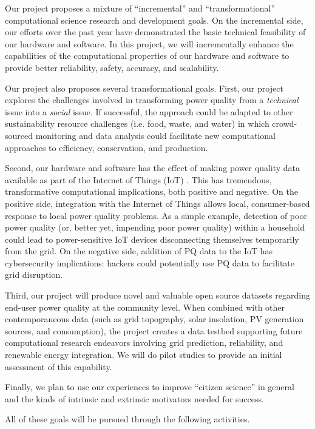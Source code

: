 Our project proposes a mixture of ``incremental'' and ``transformational'' computational science research and development goals. On the incremental side, our efforts over the past year have demonstrated the basic technical feasibility of our hardware and software. In this project, we will incrementally enhance the capabilities of the computational properties of our hardware and software to provide better reliability, safety, accuracy, and scalability.   

Our project also proposes several transformational goals.  First, our project explores the challenges involved in transforming power quality from a {\em technical} issue into a {\em social} issue. If successful, the approach could be adapted to other sustainability resource challenges (i.e. food, waste, and water) in which crowd-sourced monitoring and data analysis could facilitate new computational approaches to efficiency, conservation, and production.

Second, our hardware and software has the effect of making power quality data available as part of the Internet of Things (IoT) \cite{iot}. This has tremendous, transformative computational implications, both positive and negative.  On the positive side, integration with the Internet of Things allows local, consumer-based response to local power quality problems. As a simple example, detection of poor power quality (or, better yet, impending poor power quality) within a household could lead to power-sensitive IoT devices disconnecting themselves temporarily from the grid. On the negative side, addition of PQ data to the IoT has cybersecurity implications: hackers could potentially use PQ data to facilitate grid disruption.  

Third, our project will produce novel and valuable open source datasets regarding end-user power quality at the community level. When combined with other contemporaneous data (such as grid topography, solar insolation, PV generation sources, and consumption), the project creates a data testbed supporting future computational research endeavors involving grid prediction, reliability, and renewable energy integration. We will do pilot studies to provide an initial assessment of this capability.

Finally, we plan to use our experiences to improve ``citizen science'' in general and the kinds of intrinsic and extrinsic motivators needed for success. 

All of these goals will be pursued through the following activities.

